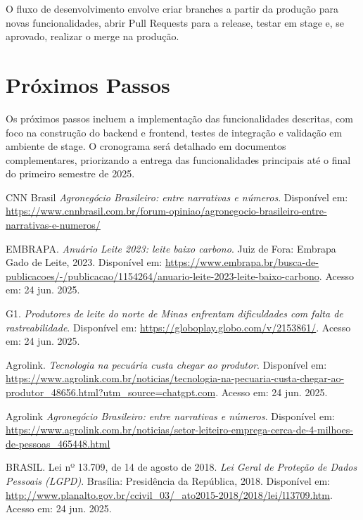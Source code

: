 \documentclass[12pt, a4paper]{article}
\begin{document}
\begin{spacing}{1.5}
\begin{spacing}{1.5}
\begin{spacing}{1.5}
O fluxo de desenvolvimento envolve criar branches a partir da produção para novas funcionalidades, abrir Pull Requests para a release, testar em stage e, se aprovado, realizar o merge na produção.

\section{Próximos Passos}
\begin{spacing}{1.5}
Os próximos passos incluem a implementação das funcionalidades descritas, com foco na construção do backend e frontend, testes de integração e validação em ambiente de stage. O cronograma será detalhado em documentos complementares, priorizando a entrega das funcionalidades principais até o final do primeiro semestre de 2025.
\end{spacing}


\begin{thebibliography}{99}

CNN Brasil \textit{Agronegócio Brasileiro: entre narrativas e números}. Disponível em: \url{https://www.cnnbrasil.com.br/forum-opiniao/agronegocio-brasileiro-entre-narrativas-e-numeros/}

EMBRAPA. \textit{Anuário Leite 2023: leite baixo carbono}. Juiz de Fora: Embrapa Gado de Leite, 2023. Disponível em: \url{https://www.embrapa.br/busca-de-publicacoes/-/publicacao/1154264/anuario-leite-2023-leite-baixo-carbono}. Acesso em: 24 jun. 2025.

G1. \textit{Produtores de leite do norte de Minas enfrentam dificuldades com falta de rastreabilidade}. Disponível em: \url{https://globoplay.globo.com/v/2153861/}. Acesso em: 24 jun. 2025.

Agrolink. \textit{Tecnologia na pecuária custa chegar ao produtor}. Disponível em: \url{https://www.agrolink.com.br/noticias/tecnologia-na-pecuaria-custa-chegar-ao-produtor_48656.html?utm_source=chatgpt.com}. Acesso em: 24 jun. 2025.

Agrolink \textit{Agronegócio Brasileiro: entre narrativas e números}. Disponível em: \url{https://www.agrolink.com.br/noticias/setor-leiteiro-emprega-cerca-de-4-milhoes-de-pessoas_465448.html}

BRASIL. Lei nº 13.709, de 14 de agosto de 2018. \textit{Lei Geral de Proteção de Dados Pessoais (LGPD)}. Brasília: Presidência da República, 2018. Disponível em: \url{http://www.planalto.gov.br/ccivil_03/_ato2015-2018/2018/lei/l13709.htm}. Acesso em: 24 jun. 2025.


\end{thebibliography}
\end{spacing}
\end{spacing}
\end{spacing}
\end{document}
